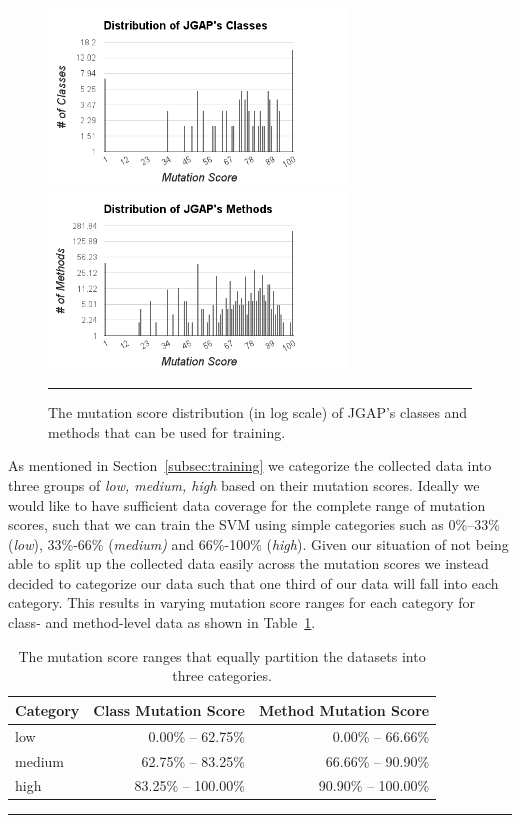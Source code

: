 \documentclass[conference]{IEEEtran}
\begin{document}
\begin{figure}[!t]
  \centering
  \includegraphics[width=8cm]{figures/class_distribution.png}
  \includegraphics[width=8cm]{figures/method_distribution.png}
  \caption{The mutation score distribution (in log scale) of JGAP's classes and methods that can be used for training.}
  \label{fig:mutation_distributions}
  \vspace{2mm}
  \hrule
\end{figure}

As mentioned in Section~\ref{subsec:training} we categorize the collected data into three groups of \textit{low, medium, high} based on their mutation scores. Ideally we would like to have sufficient data coverage for the complete range of mutation scores, such that we can train the SVM using simple categories such as 0\%--33\% (\textit{low}), 33\%-66\% (\textit{medium)} and 66\%-100\% (\textit{high}). Given our situation of not being able to split up the collected data easily across the mutation scores we instead decided to categorize our data such that one third of our data will fall into each category. This results in varying mutation score ranges for each category for class- and method-level data as shown in Table~\ref{tab:results_details}.

\begin{table}[!t]
  \centering
  \begin{tabular}{|l|r|r|}
    \hline
    \rowcolor[RGB]{169,196,223}
    \textbf{Category} & \textbf{Class Mutation Score} & \textbf{Method Mutation Score} \\
    \hline low & 0.00\% -- 62.75\% & 0.00\% -- 66.66\% \\
    \hline medium & 62.75\% -- 83.25\% & 66.66\% -- 90.90\% \\
    \hline high & 83.25\% -- 100.00\% & 90.90\% -- 100.00\% \\
    \hline
  \end{tabular}
  \caption{The mutation score ranges that equally partition the datasets into three categories.}
  \label{tab:results_details}
  \vspace{2mm}
  \hrule
\end{table}
\end{document}
